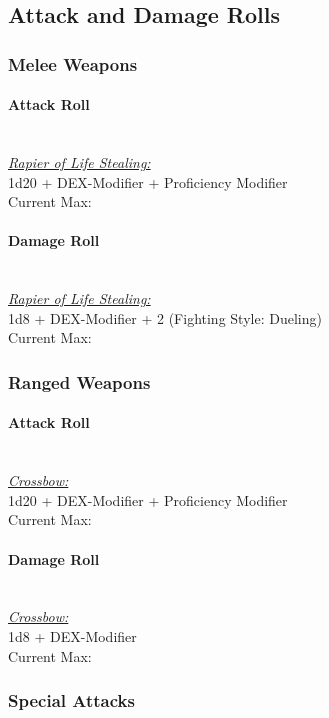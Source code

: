 \documentclass[letterpaper,openany,oneside,twocolumn]{book}
\begin{document}
\subsection*{Attack and Damage Rolls}
\subsubsection*{Melee Weapons}
\paragraph*{Attack Roll}\hfill\\
\underline{\textit{Rapier of Life Stealing:}}\\
1d20 + DEX-Modifier + Proficiency Modifier\\
\indent Current Max: 
\paragraph*{Damage Roll}\hfill\\
\underline{\textit{Rapier of Life Stealing:}}\\
1d8 + DEX-Modifier + 2 (Fighting Style: Dueling)\\
\indent Current Max: 
\subsubsection*{Ranged Weapons}
\paragraph*{Attack Roll}\hfill\\
\underline{\textit{Crossbow:}}\\
1d20 + DEX-Modifier + Proficiency Modifier\\
\indent Current Max: 
\paragraph*{Damage Roll}\hfill\\
\underline{\textit{Crossbow:}}\\
1d8 + DEX-Modifier\\
\indent Current Max: 
\subsubsection*{Special Attacks}
\end{document}
